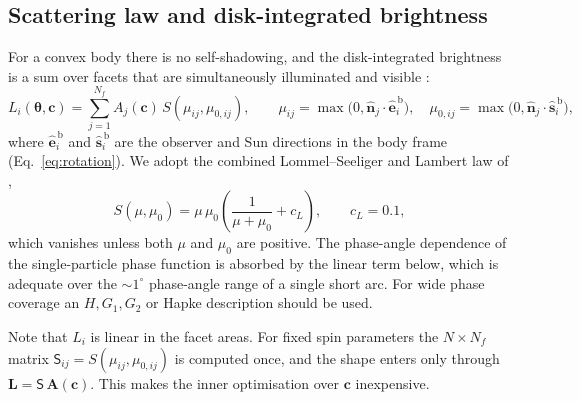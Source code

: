 \documentclass[11pt,a4paper]{article}
\theoremstyle{remark}
\newcommand{\vect}[1]{\bm{#1}}
\newcommand{\uv}[1]{\hat{\bm{#1}}}
\begin{document}
\subsection{Scattering law and disk-integrated brightness}
For a convex body there is no self-shadowing, and the disk-integrated brightness is a sum over facets
that are simultaneously illuminated and visible \citep{kaasalainen1992}:
\begin{equation}
  L_i(\vect\theta,\vect c) = \sum_{j=1}^{N_f} A_j(\vect c)\,S(\mu_{ij},\mu_{0,ij}),\qquad
  \mu_{ij}=\max\bigl(0,\uv n_j\cdot\uv e_i^{\,\mathrm b}\bigr),\quad
  \mu_{0,ij}=\max\bigl(0,\uv n_j\cdot\uv s_i^{\,\mathrm b}\bigr),
  \label{eq:brightness}
\end{equation}
where $\uv e_i^{\,\mathrm b}$ and $\uv s_i^{\,\mathrm b}$ are the observer and Sun directions in the body
frame (Eq.~\ref{eq:rotation}). We adopt the combined Lommel--Seeliger and Lambert law of
\citet{kaasalainen2001b},
\begin{equation}
  S(\mu,\mu_0) = \mu\,\mu_0\left(\frac{1}{\mu+\mu_0}+c_L\right),\qquad c_L=0.1,
  \label{eq:scattering}
\end{equation}
which vanishes unless both $\mu$ and $\mu_0$ are positive. The phase-angle dependence of the
single-particle phase function is absorbed by the linear term below, which is adequate over the
$\sim1^\circ$ phase-angle range of a single short arc. For wide phase coverage an $H,G_1,G_2$
\citep{muinonen2010} or Hapke \citep{hapke2012} description should be used.

Note that $L_i$ is linear in the facet areas. For fixed spin parameters the $N\times N_f$ matrix
$\mathsf S_{ij}=S(\mu_{ij},\mu_{0,ij})$ is computed once, and the shape enters only through
$\vect L=\mathsf S\,\vect A(\vect c)$. This makes the inner optimisation over $\vect c$ inexpensive.
\end{document}
